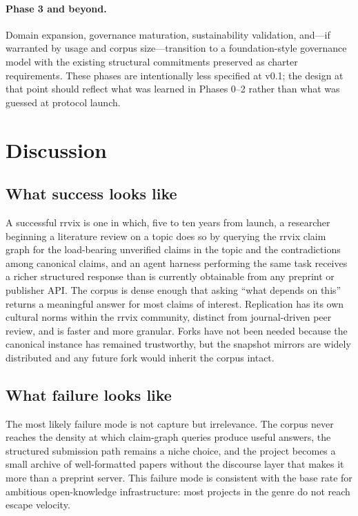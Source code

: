 \documentclass[11pt]{rrvix}
\begin{document}
\paragraph{Phase 3 and beyond.} Domain expansion, governance maturation, sustainability validation, and---if warranted by usage and corpus size---transition to a foundation-style governance model with the existing structural commitments preserved as charter requirements. These phases are intentionally less specified at v0.1; the design at that point should reflect what was learned in Phases 0--2 rather than what was guessed at protocol launch.

\section{Discussion}
\label{sec:discussion}

\subsection{What success looks like}

A successful rrvix is one in which, five to ten years from launch, a researcher beginning a literature review on a topic does so by querying the rrvix claim graph for the load-bearing unverified claims in the topic and the contradictions among canonical claims, and an agent harness performing the same task receives a richer structured response than is currently obtainable from any preprint or publisher API. The corpus is dense enough that asking ``what depends on this'' returns a meaningful answer for most claims of interest. Replication has its own cultural norms within the rrvix community, distinct from journal-driven peer review, and is faster and more granular. Forks have not been needed because the canonical instance has remained trustworthy, but the snapshot mirrors are widely distributed and any future fork would inherit the corpus intact.

\subsection{What failure looks like}

The most likely failure mode is not capture but irrelevance. The corpus never reaches the density at which claim-graph queries produce useful answers, the structured submission path remains a niche choice, and the project becomes a small archive of well-formatted papers without the discourse layer that makes it more than a preprint server. This failure mode is consistent with the base rate for ambitious open-knowledge infrastructure: most projects in the genre do not reach escape velocity.
\end{document}
